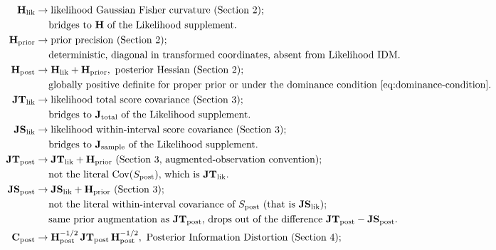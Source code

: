 \documentclass[11pt]{article}
\begin{document}
\begin{align*}
\mathbf H_{\mathrm{lik}}
&\rightarrow
\text{likelihood Gaussian Fisher curvature (Section~2);}\\
&\phantom{\rightarrow}\ \text{bridges to } \mathbf H \text{ of the Likelihood supplement.}\\
\mathbf H_{\mathrm{prior}}
&\rightarrow
\text{prior precision (Section~2);}\\
&\phantom{\rightarrow}\ \text{deterministic, diagonal in transformed coordinates, absent from Likelihood IDM.}\\
\mathbf H_{\mathrm{post}}
&\rightarrow
\mathbf H_{\mathrm{lik}} + \mathbf H_{\mathrm{prior}},\ \text{posterior Hessian (Section~2);}\\
&\phantom{\rightarrow}\ \text{globally positive definite for proper prior or under the dominance condition \eqref{eq:dominance-condition}.}\\
\mathbf{JT}_{\mathrm{lik}}
&\rightarrow
\text{likelihood total score covariance (Section~3);}\\
&\phantom{\rightarrow}\ \text{bridges to } \mathbf J_{\mathrm{total}} \text{ of the Likelihood supplement.}\\
\mathbf{JS}_{\mathrm{lik}}
&\rightarrow
\text{likelihood within-interval score covariance (Section~3);}\\
&\phantom{\rightarrow}\ \text{bridges to } \mathbf J_{\mathrm{sample}} \text{ of the Likelihood supplement.}\\
\mathbf{JT}_{\mathrm{post}}
&\rightarrow
\mathbf{JT}_{\mathrm{lik}} + \mathbf H_{\mathrm{prior}}\ \text{(Section~3, augmented-observation convention);}\\
&\phantom{\rightarrow}\ \text{not the literal } \mathrm{Cov}(S_{\mathrm{post}})\text{, which is } \mathbf{JT}_{\mathrm{lik}}.\\
\mathbf{JS}_{\mathrm{post}}
&\rightarrow
\mathbf{JS}_{\mathrm{lik}} + \mathbf H_{\mathrm{prior}}\ \text{(Section~3);}\\
&\phantom{\rightarrow}\ \text{not the literal within-interval covariance of } S_{\mathrm{post}}\text{ (that is } \mathbf{JS}_{\mathrm{lik}}\text{);}\\
&\phantom{\rightarrow}\ \text{same prior augmentation as } \mathbf{JT}_{\mathrm{post}}\text{, drops out of the difference } \mathbf{JT}_{\mathrm{post}} - \mathbf{JS}_{\mathrm{post}}.\\
\mathbf C_{\mathrm{post}}
&\rightarrow
\mathbf H_{\mathrm{post}}^{-1/2}\, \mathbf{JT}_{\mathrm{post}}\, \mathbf H_{\mathrm{post}}^{-1/2},\ \text{Posterior Information Distortion (Section~4);}\\

\end{align*}
\end{document}
